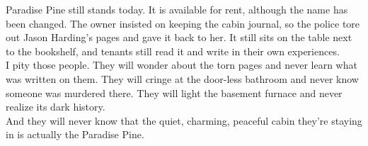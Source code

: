 \documentclass[a5paper]{scrartcl}
\begin{document}
Paradise Pine still stands today. It is available for rent, although the name has been changed. The owner insisted on keeping the cabin journal, so the police tore out Jason Harding's pages and gave it back to her. It still sits on the table next to the bookshelf, and tenants still read it and write in their own experiences. \\


I pity those people. They will wonder about the torn pages and never learn what was written on them. They will cringe at the door-less bathroom and never know someone was murdered there. They will light the basement furnace and never realize its dark history. \\


And they will never know that the quiet, charming, peaceful cabin they're staying in is actually the Paradise Pine.
\end{document}
